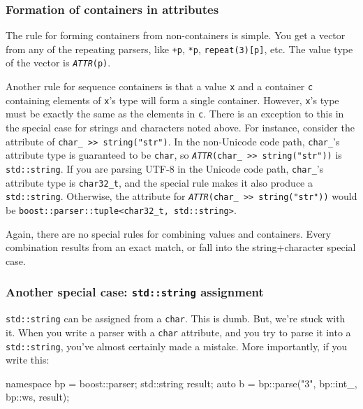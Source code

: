 \subsubsection{Formation of containers in attributes}

The rule for forming containers from non-containers is simple. You get a vector from any of the repeating parsers, like \texttt{+p}, \texttt{*p}, \texttt{repeat(3){[}p{]}}, etc. The value type of the vector is \emph{\texttt{ATTR}}\texttt{(p)}.

Another rule for sequence containers is that a value \texttt{x} and a container \texttt{c} containing elements of \texttt{x}'s type will form a single container. However, \texttt{x}'s type must be exactly the same as the elements in \texttt{c}. There is an exception to this in the special case for strings and characters noted above. For instance, consider the attribute of \texttt{char\_ >> string("str")}. In the non-Unicode code path, \texttt{char\_}'s attribute type is guaranteed to be \texttt{char}, so \emph{\texttt{ATTR}}\texttt{(char\_ >> string("str"))} is \texttt{std::string}. If you are parsing UTF-8 in the Unicode code path, \texttt{char\_}'s attribute type is \texttt{char32\_t}, and the special rule makes it also produce a \texttt{std::string}. Otherwise, the attribute for \emph{\texttt{ATTR}}\texttt{(char\_ >> string("str"))} would be \texttt{boost::parser::tuple<char32\_t, std::string>}.

Again, there are no special rules for combining values and containers. Every combination results from an exact match, or fall into the string+character special case.

\label{tutorial_split_004.html}{}

\subsubsection{\texorpdfstring{Another special case: \texttt{std::string} assignment}{Another special case: std::string assignment}}

\texttt{std::string} can be assigned from a \texttt{char}. This is dumb. But, we're stuck with it. When you write a parser with a \texttt{char} attribute, and you try to parse it into a \texttt{std::string}, you've almost certainly made a mistake. More importantly, if you write this:

\begin{code}
namespace bp = boost::parser;
std::string result;
auto b = bp::parse("3", bp::int_, bp::ws, result);
\end{code}

